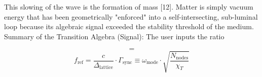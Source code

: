 
\begin{tzpsnapshot}
\end{tzpsnapshot}

This slowing of the wave is the formation of mass [12]. Matter is simply vacuum energy that has been geometrically "enforced" into a self-intersecting, sub-luminal loop because its algebraic signal exceeded the stability threshold of the medium. Summary of the Transition Algebra (Signal): The user inputs the ratio

\[
=
\]
\[
f_{\text{ref}} = \frac{c}{\Delta_{\text{lattice}}} \cdot \Gamma_{\text{sync}} \equiv \omega_{\text{mode}} \cdot \sqrt{\frac{N_{\text{nodes}}}{\chi_T}}
\]

